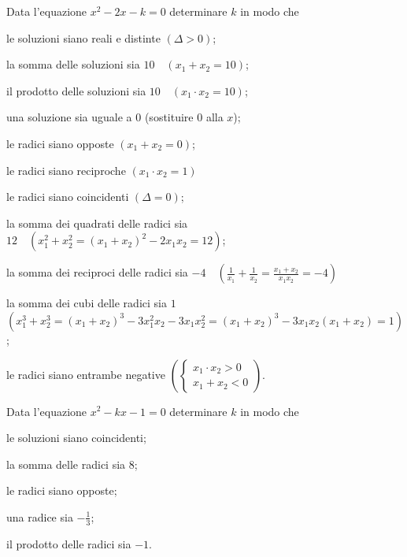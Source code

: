 \begin{esercizio}[\Ast]
 \label{ese:3.104}
Data l'equazione $x^{2}-2 x-k = 0$ determinare $k$ in modo che
\begin{enumeratea}
\item le soluzioni siano reali e distinte \quad $(\Delta>0)$;
\item la somma delle soluzioni sia $10 \quad (x_{1} + x_{2} = 10)$;
\item il prodotto delle soluzioni sia $10 \quad (x_{1} \cdot x_{2} = 10)$;
\item una soluzione sia uguale a $0$ \quad (sostituire $0$ alla $x$);
\item le radici siano opposte \quad $(x_{1} + x_{2} = 0)$;
\item le radici siano reciproche \quad $(x_{1} \cdot x_{2} = 1)$
\item le radici siano coincidenti \quad $(\Delta=0)$;
\item la somma dei quadrati delle radici sia $12 \quad \left(x_{1}^{2} + x_{2}^{2} = (x_{1} + x_{2})^{2}-2x_{1} x_{2} = 12\right)$;
\item la somma dei reciproci delle radici sia $-4 \quad \left(\frac{1}{x_{1}} + \frac{1}{x_{2}} = \frac{x_{1} +x_{2}}{x_{1} x_{2}} =-4 \right)$
\item la somma dei cubi delle radici sia $1$ \protect\\ $\left( x_{1}^{3} + x_{2}^{3} = (x_{1} + x_{2})^{3}-3x_{1}^{2} x_{2}-3x_{1} x_{2}^{2} = (x_{1} + x_{2})^{3}-3x_{1} x_{2} (x_{1} + x_{2}) = 1\right)$;
\item le radici siano entrambe negative $\left(\left\{\begin{array}{l} x_{1} \cdot x_{2} > 0 \\x_{1} + x_{2} < 0 \end{array}\right.\right)$.
\end{enumeratea}
\end{esercizio}

\begin{esercizio}[\Ast]
 \label{ese:3.105}
Data l'equazione $x^{2}-k x-1 = 0$ determinare $k$ in modo che
\begin{enumeratea}
\item le soluzioni siano coincidenti;
\item la somma delle radici sia $8$;
\item le radici siano opposte;
\item una radice sia $- \frac{1}{3}$;
\item il prodotto delle radici sia $-1$.
\end{enumeratea}
\end{esercizio}

